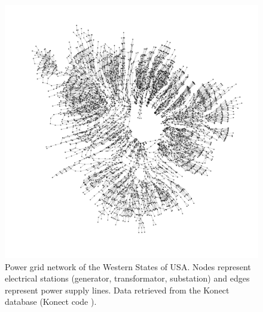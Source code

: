 \documentclass[
11pt, %
english, %
singlespacing, %
nolistspacing, %
liststotoc, %
headsepline, %
]{MastersDoctoralThesis} %
\begin{document}
\begin{figure}
	\includegraphics[width=\textwidth]{network-US-power-grid.pdf}
	\caption{Power grid network of the Western States of USA. Nodes represent electrical stations (generator, transformator, substation) and edges represent power supply lines. Data retrieved from the Konect database \cite{kunegis2013konect} (Konect code ).}
	\label{Figure: Network of western US powergrid}
\end{figure}
\end{document}
